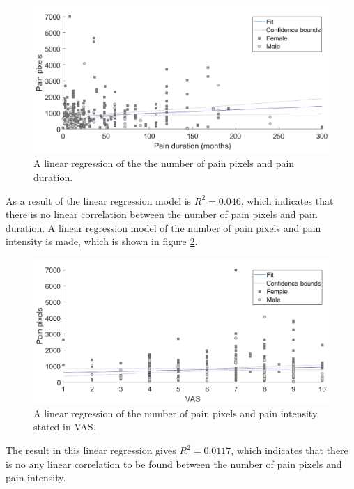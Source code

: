 \begin{figure} [H]
\centering
\includegraphics[width=1\textwidth]{figures/durapixel}
\caption{A linear regression of the the number of pain pixels and pain duration.}
\label{fig:durapixel}
\end{figure}

\noindent
As a result of the linear regression model is $R^2=0.046$, which indicates that there is no linear correlation between the number of pain pixels and pain duration.\newline
\noindent
A linear regression model of the number of pain pixels and pain intensity is made, which is shown in figure \ref{fig:painRegression}. \newline

\begin{figure} [H]
\centering
\includegraphics[width=1\textwidth]{figures/vaspixel}
\caption{A linear regression of the number of pain pixels and pain intensity stated in VAS.}
\label{fig:painRegression}
\end{figure}

\noindent
The result in this linear regression gives $R^2=0.0117$, which indicates that there is no any linear correlation to be found between the number of pain pixels and pain intensity.\newline

